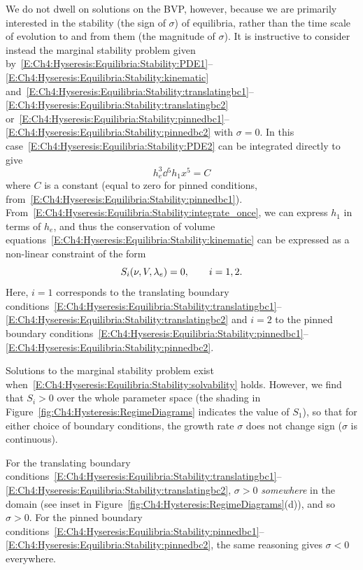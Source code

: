 We do not dwell on solutions on the BVP, however, because we are primarily interested in the stability (the sign of $\sigma$) of equilibria, rather than the time scale of evolution to and from them (the magnitude of $\sigma$). It is instructive to consider instead the marginal stability problem given by~\eqref{E:Ch4:Hyseresis:Equilibria:Stability:PDE1}--\eqref{E:Ch4:Hyseresis:Equilibria:Stability:kinematic} and~\eqref{E:Ch4:Hyseresis:Equilibria:Stability:translatingbc1}--\eqref{E:Ch4:Hyseresis:Equilibria:Stability:translatingbc2} or~\eqref{E:Ch4:Hyseresis:Equilibria:Stability:pinnedbc1}--\eqref{E:Ch4:Hyseresis:Equilibria:Stability:pinnedbc2}  with $\sigma = 0$. In this case~\eqref{E:Ch4:Hyseresis:Equilibria:Stability:PDE2} can be integrated directly to give
\begin{equation}\label{E:Ch4:Hyseresis:Equilibria:Stability:integrate_once}
h_e^3 \dd{^5 h_1}{x^5} = C
\end{equation}
where $C$ is a constant (equal to zero for pinned conditions, from~\eqref{E:Ch4:Hyseresis:Equilibria:Stability:pinnedbc1}). From~\eqref{E:Ch4:Hyseresis:Equilibria:Stability:integrate_once}, we can express $h_1$ in terms of $h_e$, and thus the conservation of volume equations~\eqref{E:Ch4:Hyseresis:Equilibria:Stability:kinematic} can be expressed as a non-linear constraint of the form
\begin{equation}\label{E:Ch4:Hyseresis:Equilibria:Stability:solvability}
S_i(\nu, V, \lambda_e) = 0, \qquad i = 1,2.
\end{equation}
Here,  $i = 1$ corresponds to the translating boundary conditions~\eqref{E:Ch4:Hyseresis:Equilibria:Stability:translatingbc1}--\eqref{E:Ch4:Hyseresis:Equilibria:Stability:translatingbc2} and $ i = 2$ to the pinned boundary conditions~\eqref{E:Ch4:Hyseresis:Equilibria:Stability:pinnedbc1}--\eqref{E:Ch4:Hyseresis:Equilibria:Stability:pinnedbc2}.

Solutions to the marginal stability problem exist when~\eqref{E:Ch4:Hyseresis:Equilibria:Stability:solvability} holds. However, we find that $S_i> 0$ over the whole parameter space (the shading in Figure~\ref{fig:Ch4:Hysteresis:RegimeDiagrams} indicates the value of $S_1$), so that for either choice of boundary conditions, the growth rate $\sigma$ does not change sign ($\sigma$ is continuous).

For the translating boundary conditions~\eqref{E:Ch4:Hyseresis:Equilibria:Stability:translatingbc1}--\eqref{E:Ch4:Hyseresis:Equilibria:Stability:translatingbc2}, $\sigma > 0$ \textit{somewhere} in the domain (see inset in Figure~\ref{fig:Ch4:Hysteresis:RegimeDiagrams}(d)), and so $\sigma > 0$. For the pinned boundary conditions~\eqref{E:Ch4:Hyseresis:Equilibria:Stability:pinnedbc1}--\eqref{E:Ch4:Hyseresis:Equilibria:Stability:pinnedbc2}, the same reasoning gives $\sigma <0$ everywhere.

